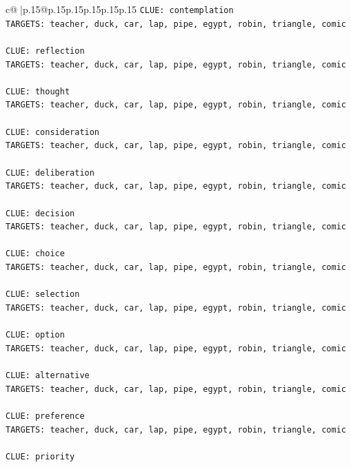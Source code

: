 \documentclass{article}
\begin{document}
{\begin{supertabular}{c@{$\;$}|p{.15\linewidth}@{}p{.15\linewidth}p{.15\linewidth}p{.15\linewidth}p{.15\linewidth}p{.15\linewidth}}
{{{\texttt{CLUE: contemplation} \\
\texttt{TARGETS: teacher, duck, car, lap, pipe, egypt, robin, triangle, comic} \\
\\ 
\texttt{CLUE: reflection} \\
\texttt{TARGETS: teacher, duck, car, lap, pipe, egypt, robin, triangle, comic} \\
\\ 
\texttt{CLUE: thought} \\
\texttt{TARGETS: teacher, duck, car, lap, pipe, egypt, robin, triangle, comic} \\
\\ 
\texttt{CLUE: consideration} \\
\texttt{TARGETS: teacher, duck, car, lap, pipe, egypt, robin, triangle, comic} \\
\\ 
\texttt{CLUE: deliberation} \\
\texttt{TARGETS: teacher, duck, car, lap, pipe, egypt, robin, triangle, comic} \\
\\ 
\texttt{CLUE: decision} \\
\texttt{TARGETS: teacher, duck, car, lap, pipe, egypt, robin, triangle, comic} \\
\\ 
\texttt{CLUE: choice} \\
\texttt{TARGETS: teacher, duck, car, lap, pipe, egypt, robin, triangle, comic} \\
\\ 
\texttt{CLUE: selection} \\
\texttt{TARGETS: teacher, duck, car, lap, pipe, egypt, robin, triangle, comic} \\
\\ 
\texttt{CLUE: option} \\
\texttt{TARGETS: teacher, duck, car, lap, pipe, egypt, robin, triangle, comic} \\
\\ 
\texttt{CLUE: alternative} \\
\texttt{TARGETS: teacher, duck, car, lap, pipe, egypt, robin, triangle, comic} \\
\\ 
\texttt{CLUE: preference} \\
\texttt{TARGETS: teacher, duck, car, lap, pipe, egypt, robin, triangle, comic} \\
\\ 
\texttt{CLUE: priority} \\
}}}
\end{supertabular}}
\end{document}
